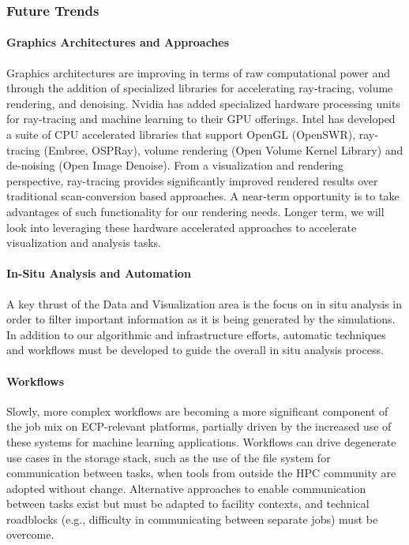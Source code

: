 \subsubsection{Future Trends}

\paragraph{Graphics Architectures and Approaches}  Graphics architectures are improving in terms of raw computational power and through the addition of specialized libraries for accelerating ray-tracing, volume rendering, and denoising. Nvidia has added specialized hardware processing units for ray-tracing and machine learning to their GPU offerings.  Intel has developed a suite of CPU accelerated libraries that support OpenGL (OpenSWR), ray-tracing (Embree, OSPRay), volume rendering (Open Volume Kernel Library) and de-noising (Open Image Denoise). From a visualization and rendering perspective, ray-tracing provides significantly improved rendered results over traditional scan-conversion based approaches.  A near-term opportunity is to take advantages of such functionality for our rendering needs. Longer term, we will look into leveraging these hardware accelerated approaches to accelerate visualization and analysis tasks.

\paragraph{In-Situ Analysis and Automation}  A key thrust of the Data and Visualization area is the focus on in situ analysis in order to filter important information as it is being generated by the simulations. In addition to our algorithmic and infrastructure efforts, automatic techniques and workflows must be developed to guide the overall in situ analysis process.

\paragraph{Workflows} Slowly, more complex workflows are becoming a more significant component of the job mix on ECP-relevant platforms, partially driven by the increased use of these systems for machine learning applications. Workflows can drive degenerate use cases in the storage stack, such as the use of the file system for communication between tasks, when tools from outside the HPC community are adopted without change. Alternative approaches to enable communication between tasks exist but must be adapted to facility contexts, and technical roadblocks (e.g., difficulty in communicating between separate jobs) must be overcome.

